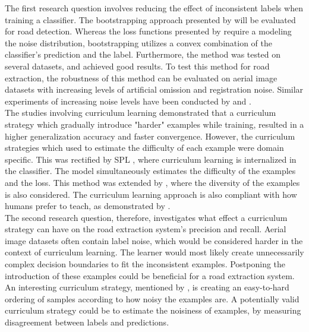 The first research question involves reducing the effect of inconsistent labels when training a classifier. The bootstrapping approach presented by \cite{Reed_noisy_labels_bootstrapping} will be evaluated for road detection. Whereas the loss functions presented by \citep{Mnih_aerial_images_noisy} require a modeling the noise distribution,  bootstrapping utilizes a convex combination of the classifier's prediction and the label. Furthermore, the method was tested on several datasets, and achieved good results. To test this method for road extraction, the robustness of this method can be evaluated on aerial image datasets with increasing levels of artificial omission and registration noise. Similar experiments of increasing noise levels have been conducted by \citep{Sukhbaatar_noisy_network_learning} and \citep{Reed_noisy_labels_bootstrapping}.\\

The studies involving curriculum learning demonstrated that a curriculum strategy which gradually introduce "harder" examples while training, resulted in a higher generalization accuracy and faster convergence. However, the curriculum strategies which \cite{Bengio_curriculumlearning} used to estimate the difficulty of each example were domain specific. This was rectified by \ac{SPL} \citep{Kumar_self_paced_learning}, where curriculum learning is internalized in the classifier. The model simultaneously estimates the difficulty of the examples and the loss. This method was extended by \citep{Lu_self-paced_learning_diversity}, where the diversity of the examples is   also considered. The curriculum learning approach is also compliant with how humans prefer to teach, as demonstrated by \cite{Khan_human_teach}.\\

The second research question, therefore, investigates what effect a curriculum strategy can have on the road extraction system's precision and recall. Aerial image datasets often contain label noise, which would be considered harder in the context of curriculum learning. The learner would most likely create unnecessarily complex decision boundaries to fit the inconsistent examples. Postponing the introduction of these examples could be beneficial for a road extraction system. An interesting curriculum strategy, mentioned by \cite{Bengio_curriculumlearning}, is creating an easy-to-hard ordering of samples according to how noisy the examples are. A potentially valid curriculum strategy could be to estimate the noisiness of examples, by measuring disagreement between labels and predictions.\\